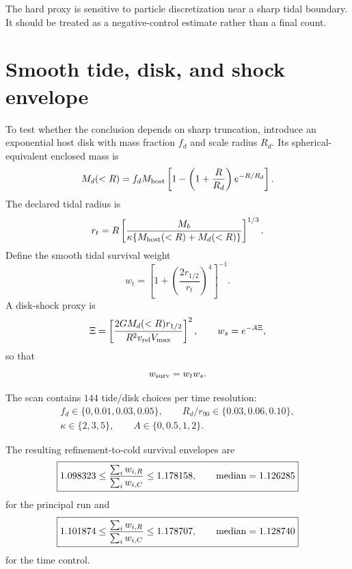 The hard proxy is sensitive to particle discretization near a sharp tidal boundary.  It should be treated as a negative-control estimate rather than a final count.

\section{Smooth tide, disk, and shock envelope}

To test whether the conclusion depends on sharp truncation, introduce an exponential host disk with mass fraction $f_d$ and scale radius $R_d$.  Its spherical-equivalent enclosed mass is
\begin{equation}
M_d(<R)
=f_dM_{\rm host}\left[1-\left(1+\frac{R}{R_d}\right)e^{-R/R_d}\right].
\label{eq:sct-disk-mass}
\end{equation}
The declared tidal radius is
\begin{equation}
r_t
=R\left[
\frac{M_b}{\kappa\{M_{\rm host}(<R)+M_d(<R)\}}
\right]^{1/3}.
\label{eq:sct-tidal-radius}
\end{equation}
Define the smooth tidal survival weight
\begin{equation}
w_t
=\left[1+\left(\frac{2r_{1/2}}{r_t}\right)^4\right]^{-1}.
\label{eq:sct-tidal-weight}
\end{equation}
A disk-shock proxy is
\begin{equation}
\Xi
=\left[
\frac{2GM_d(<R)r_{1/2}}
{R^2v_{\rm rel}V_{\max}}
\right]^2,
\qquad
w_s=e^{-A\Xi},
\label{eq:sct-shock}
\end{equation}
so that
\begin{equation}
w_{\rm surv}=w_tw_s.
\label{eq:sct-survival-weight}
\end{equation}

The scan contains $144$ tide/disk choices per time resolution:
\begin{equation}
\begin{gathered}
f_d\in\{0,0.01,0.03,0.05\},
\qquad
R_d/r_{90}\in\{0.03,0.06,0.10\},\\
\kappa\in\{2,3,5\},
\qquad
A\in\{0,0.5,1,2\}.
\end{gathered}
\label{eq:sct-gravity-grid}
\end{equation}

The resulting refinement-to-cold survival envelopes are
\begin{equation}
\boxed{
1.098323
\leq
\frac{\sum_iw_{i,R}}{\sum_iw_{i,C}}
\leq
1.178158,
\qquad
\operatorname{median}=1.126285
}
\label{eq:sct-smooth-zoom}
\end{equation}
for the principal run and
\begin{equation}
\boxed{
1.101874
\leq
\frac{\sum_iw_{i,R}}{\sum_iw_{i,C}}
\leq
1.178707,
\qquad
\operatorname{median}=1.128740
}
\label{eq:sct-smooth-fine}
\end{equation}
for the time control.

